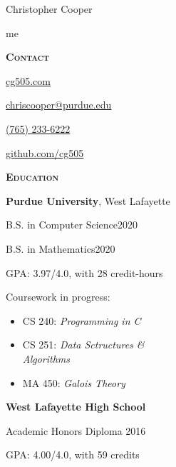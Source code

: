 \documentclass[11pt]{article}
\newcommand{\sectionfont}{\Large\scshape\bfseries\color{cg505green}}
\begin{document}
\begin{centering}
  \fontsize{40pt}{50pt}\selectfont
  \color{cg505green}
  Christopher Cooper

\end{centering}

\vspace{10pt}

\begin{minipage}[t]{0.3\textwidth}
  {\Huge\color{black} me \phantom{my work}}

  \vspace{5pt}

  {\sectionfont Contact}
  \begin{adjustwidth}{10pt}{}
    \href{https://cg505.com/}{cg505.com}

    \href{mailto:chriscooper@purdue.edu}{chriscooper@purdue.edu}

    \href{tel:+17652336222}{(765) 233-6222}

    \href{https://github.com/cg505/}{github.com/cg505}
  \end{adjustwidth}

  \vspace{5pt}

  {\sectionfont Education}

  \textbf{Purdue University}, West Lafayette
  \begin{adjustwidth}{10pt}{}
    B.S. in Computer Science\hfill2020

    B.S. in Mathematics\hfill2020

    GPA: 3.97/4.0, with 28 credit-hours

    Coursework in progress:
    \begin{itemize}[leftmargin=*]
    \item CS 240: \emph{Programming in C}
    \item CS 251: \emph{Data Sctructures \&}\\\phantom{CS 251:} \emph{Algorithms}
    \item MA 450: \emph{Galois Theory}
    \end{itemize}
  \end{adjustwidth}

  \textbf{West Lafayette High School}
  \begin{adjustwidth}{10pt}{}
    Academic Honors Diploma \hfill2016

    GPA: 4.00/4.0, with 59 credits
  \end{adjustwidth}


\end{minipage}
\end{document}
